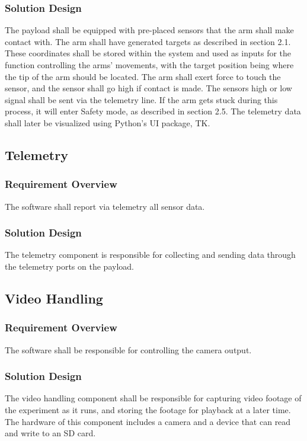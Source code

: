 \documentclass[letterpaper,10pt]{article}
\begin{document}
\subsubsection{Solution Design}
The payload shall be equipped with pre-placed sensors that the arm shall make contact with. The arm shall have generated targets
as described in section 2.1. These coordinates shall be stored within the system and used as inputs for the function controlling
the arms' movements, with the target position being where the tip of the arm should be located. The arm shall exert force to touch
the sensor, and the sensor shall go high if contact is made. The sensors high or low signal shall be sent via the telemetry
line. If the arm gets stuck during this process, it will enter Safety mode, as described in section 2.5. The telemetry data shall
later be visualized using Python's UI package, TK. 

\subsection{Telemetry}
\subsubsection{Requirement Overview}
The software shall report via telemetry all sensor data.

\subsubsection{Solution Design}
The telemetry component is responsible for collecting and sending data through the
telemetry ports on the \gls{payload}.

\subsection{Video Handling}
\subsubsection{Requirement Overview}
The software shall be responsible for controlling the camera output.

\subsubsection{Solution Design}
The video handling component shall be responsible for capturing video footage of
the experiment as it runs, and storing the footage for playback at a later time.
The hardware of this component includes a camera and a device that can read
and write to an SD card.
\end{document}
